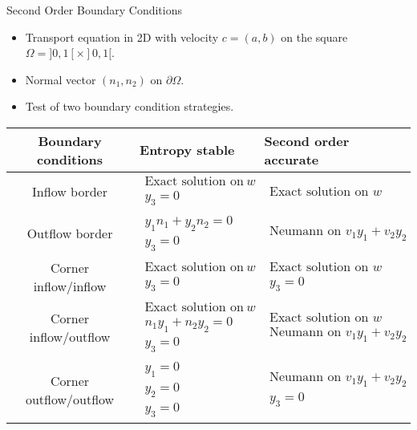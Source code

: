 \documentclass[english]{beamer}
\begin{document}
%
\begin{frame}{Second Order Boundary Conditions\cite{helie:tel-04034510,helluy_bc2023}}
\begin{itemize}
\item Transport equation in 2D with velocity $c=(a,b)$ on the square $\Omega=]0,1[\times]0,1[$. 
\item Normal vector $(n_{1},n_{2})$ on $\partial\Omega$.
\item Test of two boundary condition strategies.\medskip{}
\end{itemize}
{\scriptsize{}
\begin{tabular}{|c|l|l|} \hline  Boundary conditions & Entropy stable & Second order accurate\tabularnewline \hline  Inflow border & $\begin{array}{l} \text{Exact solution on }w\\ y_{3}=0 \end{array}$ & $\begin{array}{l} \text{Exact solution on }w\end{array}$\tabularnewline \hline  Outflow border & $\begin{array}{l} y_{1}n_{1}+y_{2}n_{2}=0\\ y_{3}=0 \end{array}$ & $\begin{array}{l} \text{Neumann on }v_{1}y_{1}+v_{2}y_{2}\end{array}$\tabularnewline \hline  Corner inflow/inflow & $\begin{array}{l} \text{Exact solution on }w\\ y_{3}=0 \end{array}$ & $\begin{array}{l} \text{Exact solution on }w\\ y_{3}=0 \end{array}$\tabularnewline \hline  Corner inflow/outflow & $\begin{array}{l} \text{Exact solution on }w\\ n_{1}y_{1}+n_{2}y_{2}=0\\ y_{3}=0 \end{array}$ & $\begin{array}{l} \text{Exact solution on }w\\ \text{Neumann on }v_{1}y_{1}+v_{2}y_{2} \end{array}$\tabularnewline \hline  Corner outflow/outflow & $\begin{array}{l} y_{1}=0\\ y_{2}=0\\ y_{3}=0 \end{array}$ & $\begin{array}{l} \text{Neumann on }v_{1}y_{1}+v_{2}y_{2}\\ y_{3}=0 \end{array}$\tabularnewline \hline  \end{tabular} }{\scriptsize\par}
\end{frame}
\end{document}
